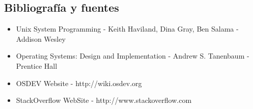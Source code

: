 \documentclass[10pt,a4paper]{article}
\begin{document}
\subsection{Bibliograf\'ia y fuentes}
\begin{itemize}
\item Unix System Programming - Keith Haviland, Dina Gray, Ben Salama - Addison Wesley
\item Operating Systems: Design and Implementation - Andrew S. Tanenbaum - Prentice Hall 
\item OSDEV Website - http://wiki.osdev.org
\item StackOverflow WebSite - http://www.stackoverflow.com
\end{itemize}
\end{document}
